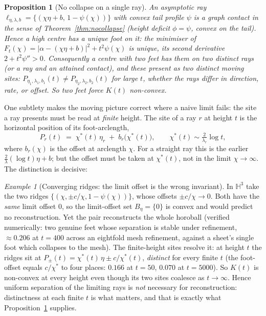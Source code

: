 \documentclass[11pt]{article}
\newtheorem{proposition}[theorem]{Proposition}
\theoremstyle{remark}
\newtheorem{example}[theorem]{Example}
\begin{document}
\begin{proposition}[No collapse on a single ray]\label{prop:nocollapse-ray}
An asymptotic ray $\ell_{\eta,\lambda,b}=\{(\chi\eta+b,\,1-\psi(\chi))
\}$ with convex tail profile $\psi$ is a graph contact in the sense of
Theorem~\ref{thm:nocollapse} (height deficit $\phi=\psi$, convex on the
tail). Hence a high centre has a \emph{unique} foot on it: the
minimiser of $F_{t}(\chi)=\lvert\alpha-(\chi\eta+b)\rvert^{2}+t^{2}
\psi(\chi)$ is unique, its second derivative $2+t^{2}\psi''>0$.
Consequently a centre with two feet has them on two \emph{distinct}
rays (or a ray and an attained contact), and these present as two
distinct moving sites: $P_{\eta_{1},\lambda_{1},b_{1}}(t)\neq
P_{\eta_{2},\lambda_{2},b_{2}}(t)$ for large $t$, whether the rays
differ in direction, rate, or offset. So two feet force $K(t)$
non-convex.
\end{proposition}

One subtlety makes the moving picture correct
where a naive limit fails: the site a ray presents must be read at
\emph{finite} height. The site of a ray $r$ at height $t$ is the
horizontal position of its foot-arclength,
\[
  P_{r}(t)\;=\;\chi^{\ast}(t)\,\eta_{r}\;+\;b_{r}\bigl(\chi^{\ast}(t)\bigr),
  \qquad \chi^{\ast}(t)\sim\tfrac{2}{\lambda_{r}}\log t ,
\]
where $b_{r}(\chi)$ is the offset at arclength $\chi$. For a straight ray
this is the earlier $\frac{2}{\lambda}(\log t)\eta+b$; but the offset must
be taken at $\chi^{\ast}(t)$, not in the limit $\chi\to\infty$. The
distinction is decisive:

\begin{example}[Converging ridges: the limit offset is the wrong invariant]
\label{ex:converging}
In $\mathbb{H}^{3}$ take the two ridges $\{(\chi,\pm c/\chi,1-\psi(\chi))
\}$, whose offsets $\pm c/\chi\to0$. Both have the \emph{same} limit
offset $0$, so the limit-offset set $B_{\eta}=\{0\}$ is convex and would
predict no reconstruction. Yet the pair reconstructs the whole horoball
(verified numerically: two genuine feet whose separation is stable under
refinement, $\approx0.206$ at $t=400$ across an eightfold mesh
refinement, against a sheet's single foot which collapses to the mesh).
The finite-height sites resolve it: at height $t$ the ridges sit at
$P_{\pm}(t)=\chi^{\ast}(t)\,\eta\pm c/\chi^{\ast}(t)$, \emph{distinct} for
every finite $t$ (the foot-offset equals $c/\chi^{\ast}$ to four places:
$0.166$ at $t=50$, $0.070$ at $t=5000$). So $K(t)$ is non-convex at every
height even though its two sites coalesce as $t\to\infty$. Hence uniform
separation of the limiting rays is \emph{not} necessary for
reconstruction: distinctness at each finite $t$ is what matters, and that
is exactly what Proposition~\ref{prop:nocollapse-ray} supplies.
\end{example}
\end{document}
